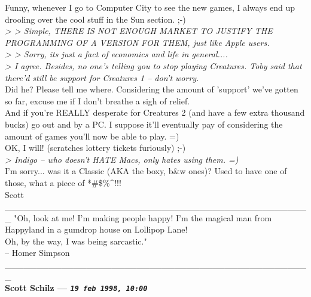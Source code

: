 \documentclass[11pt,twoside,a4paper]{article}
\begin{document}
\begin{multicols*}{2}
Funny, whenever I go to Computer City to see the new games, I always end up drooling over the cool stuff in the Sun section. ;-) ~\\

\emph{> > Simple, THERE IS NOT ENOUGH MARKET TO JUSTIFY THE PROGRAMMING OF A VERSION FOR THEM, just like Apple users.} ~\\
\emph{> > Sorry, its just a fact of economics and life in general....} ~\\

\emph{> I agree. Besides, no one's telling you to stop playing Creatures. Toby said that there'd still be support for Creatures 1 -- don't worry.} ~\\

Did he? Please tell me where. Considering the amount of 'support' we've gotten so far, excuse me if I don't breathe a sigh of relief. ~\\

And if you're REALLY desperate for Creatures 2 (and have a few extra thousand bucks) go out and by a PC. I suppose it'll eventually pay of considering the amount of games you'll now be able to play. =) ~\\

OK, I will! (scratches lottery tickets furiously) ;-) ~\\

\emph{> Indigo -- who doesn't HATE Macs, only hates using them. =)} ~\\

I'm sorry... was it a Classic (AKA the boxy, b\&w ones)? Used to have one of those, what a piece of *\#\$\%\^\@!!! ~\\

Scott ~\\

\_\_\_\_\_\_\_\_\_\_\_\_\_\_\_\_\_\_\_\_\_\_\_\_\_\_\_\_\_\_\_\_\_\_\_\_\_\_\_\_\_\_\_\_\_\_\_\_\_
"Oh, look at me! I'm making people happy! I'm the magical man from Happyland in a gumdrop house on Lollipop Lane! ~\\
Oh, by the way, I was being sarcastic." ~\\
-- Homer Simpson ~\\
\_\_\_\_\_\_\_\_\_\_\_\_\_\_\_\_\_\_\_\_\_\_\_\_\_\_\_\_\_\_\_\_\_\_\_\_\_\_\_\_\_\_\_\_\_\_\_\_\_ ~\\

 
		
	
		
\textbf{Scott Schilz --- \emph{\texttt{19 feb 1998, 10:00}}}~\\


\end{multicols*}
\end{document}
